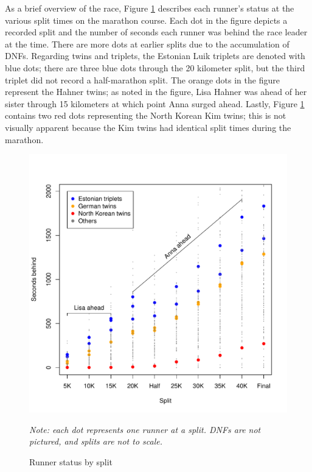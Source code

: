 \documentclass[12pt,titlepage]{article}
\begin{document}
As a brief overview of the race, Figure \ref{fig:secondsbehind}
describes each runner's status at the various split times on the
marathon course.  Each dot in the figure depicts a recorded split and
the number of seconds each runner was behind the race leader at the
time.  There are more dots at earlier splits due to the accumulation
of DNFs.  Regarding twins and triplets, the Estonian Luik triplets are
denoted with blue dots; there are three blue dots through the 20
kilometer split, but the third triplet did not record a half-marathon
split.  The orange dots in the figure represent the Hahner twins; as
noted in the figure, Lisa Hahner was ahead of her sister through 15
kilometers at which point Anna surged ahead.  Lastly, Figure
\ref{fig:secondsbehind} contains two red dots representing the North
Korean Kim twins; this is not visually apparent because the Kim twins
had identical split times during the marathon.

\begin{figure}[!ht]
  \centering
  \caption{Runner status by split}
  \label{fig:secondsbehind}
  \includegraphics[scale = 1]{seconds-behind.pdf}
  \begin{flushleft}
    \emph{Note: each dot represents one runner at a split.  DNFs are
      not pictured, and splits are not to scale.}
  \end{flushleft}
\end{figure}
\end{document}
